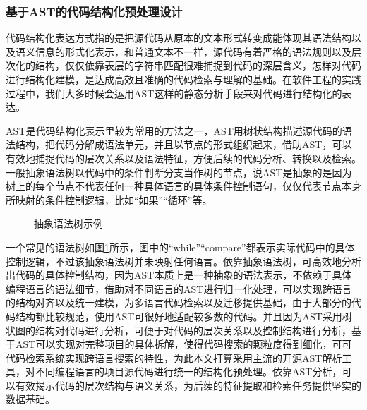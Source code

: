 \documentclass[UTF8,a4paper,12pt]{ctexart}
\numberwithin{equation}{section}
\begin{document}
\subsubsection{基于AST的代码结构化预处理设计}
代码结构化表达方式指的是把源代码从原本的文本形式转变成能体现其语法结构以及语义信息的形式化表示，和普通文本不一样，源代码有着严格的语法规则以及层次化的结构，仅仅依靠表层的字符串匹配很难捕捉到代码的深层含义，怎样对代码进行结构化建模，是达成高效且准确的代码检索与理解的基础。在软件工程的实践过程中，我们大多时候会运用AST这样的静态分析手段来对代码进行结构化的表达。\par
AST是代码结构化表示里较为常用的方法之一，AST用树状结构描述源代码的语法结构，把代码分解成语法单元，并且以节点的形式组织起来，借助AST，可以有效地捕捉代码的层次关系以及语法特征，方便后续的代码分析、转换以及检索。一般抽象语法树以代码中的条件判断分支当作树的节点，说AST是抽象的是因为树上的每个节点不代表任何一种具体语言的具体条件控制语句，仅仅代表节点本身所映射的条件控制逻辑，比如“如果”“循环”等。\par
\begin{figure}[H]
	\caption{抽象语法树示例}
	\label{ast}
\end{figure}
一个常见的语法树如图\ref{ast}所示，图中的“while”“compare”都表示实际代码中的具体控制逻辑，不过该抽象语法树并未映射任何语言。依靠抽象语法树，可高效地分析出代码的具体控制结构，因为AST本质上是一种抽象的语法表示，不依赖于具体编程语言的语法细节，借助对不同语言的AST进行归一化处理，可以实现跨语言的结构对齐以及统一建模，为多语言代码检索以及迁移提供基础，由于大部分的代码结构都比较规范，使用AST可很好地适配较多数的代码。并且因为AST采用树状图的结构对代码进行分析，可便于对代码的层次关系以及控制结构进行分析，基于AST可以实现对完整项目的具体拆解，使得代码搜索的颗粒度得到细化，可可代码检索系统实现跨语言搜索的特性，为此本文打算采用主流的开源AST解析工具，对不同编程语言的项目源代码进行统一的结构化预处理。依靠AST分析，可以有效揭示代码的层次结构与语义关系，为后续的特征提取和检索任务提供坚实的数据基础。
\end{document}
